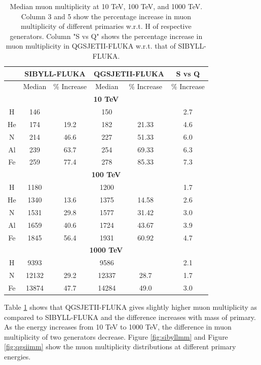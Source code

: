 \documentclass[12pt]{article}
\begin{document}
\begin{table}
\centering
\begin{tabular}{ | c | c | c | c | c | c |} 
\hline
& \multicolumn{2}{|c|}{\textbf{SIBYLL-FLUKA}} & \multicolumn{2}{|c|}{\textbf{QGSJETII-FLUKA}} & S vs Q \\
\hline
 & Median & \% Increase & Median & \% Increase & \% Increase \\
\hline 
\multicolumn{6}{|c|}{\textbf{10 TeV}} \\
\hline
H 	&	146	&	      & 150 &			& 2.7 \\
\hline
He 	&	174 &	19.2 &	182	&	21.33	&	4.6	\\
\hline
N 	& 	214 & 	46.6 &	227	&	51.33	&6.0	\\
\hline
Al 	& 	239 & 	63.7 &	254	&	69.33	&6.3	\\
\hline
Fe 	& 	259 & 	77.4 &	278	&	85.33	&7.3	\\
\hline
\multicolumn{6}{|c|}{\textbf{100 TeV}} \\
\hline
H & 1180 &  & 1200 & & 1.7 \\
\hline
He & 1340 & 13.6  & 1375 & 14.58	& 2.6\\
\hline
N & 1531 & 29.8 & 1577 & 31.42 	& 3.0\\
\hline
Al & 1659 & 40.6 & 1724 & 43.67 	& 3.9\\
\hline
Fe & 1845 & 56.4 & 1931 & 60.92	& 4.7\\
\hline
\multicolumn{6}{|c|}{\textbf{1000 TeV}} \\
\hline
H & 9393 &  & 9586 & & 2.1\\
\hline
N & 12132 & 29.2 & 12337 & 28.7 & 1.7\\
\hline
Fe & 13874 & 47.7 & 14284 & 49.0 & 3.0\\
\hline
\end{tabular}
\caption{Median muon multiplicity at 10 TeV, 100 TeV, and 1000 TeV. Column 3 and 5 show the percentage increase in muon multiplicity of different primaries w.r.t. H of respective generators. Column "S vs Q" shows the percentage increase in muon multiplicity in QGSJETII-FLUKA w.r.t. that of SIBYLL-FLUKA.\label{tab:muon_multiplicity}}
\end{table}

Table \ref{tab:muon_multiplicity} shows that QGSJETII-FLUKA gives slightly
	higher muon multiplicity as compared to SIBYLL-FLUKA and the difference
	increases with mass of primary. As the energy increases from 10 TeV to
	1000 TeV, the difference in muon multiplicity of two generators
	decrease. Figure \ref{fig:sibyllmm} and Figure \ref{fig:qgsiimm} show
	the muon multiplicity distributions  at different primary energies.
\end{document}
